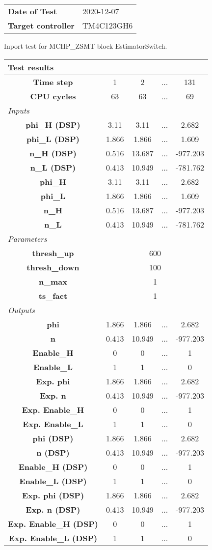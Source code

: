 \begin{tabular}{l l}
\textbf{Date of Test} & 2020-12-07 \tabularnewline
\textbf{Target controller} & TM4C123GH6 \tabularnewline
\end{tabular}
\vspace{1ex}
Inport test for MCHP_ZSMT block EstimatorSwitch.

\vspace{1em}
\begin{tabularx}{\textwidth}{|c|c|c|>{\centering\arraybackslash}X|c|}
\hline
\multicolumn{5}{|l|}{\cellcolor[gray]{0.8}\textbf{Test results}} \tabularnewline \hline
\textbf{Time step} & 1 & 2 & ... & 131 \tabularnewline \hline
\textbf{CPU cycles} & 63 & 63 & ... & 69 \tabularnewline \hline
\multicolumn{5}{|l|}{\cellcolor[gray]{0.9}\textit{Inputs}} \tabularnewline \hline
\textbf{phi\_H (DSP)} & 3.11 & 3.11 & ... & 2.682 \tabularnewline \hline
\textbf{phi\_L (DSP)} & 1.866 & 1.866 & ... & 1.609 \tabularnewline \hline
\textbf{n\_H (DSP)} & 0.516 & 13.687 & ... & -977.203 \tabularnewline \hline
\textbf{n\_L (DSP)} & 0.413 & 10.949 & ... & -781.762 \tabularnewline \hline
\textbf{phi\_H} & 3.11 & 3.11 & ... & 2.682 \tabularnewline \hline
\textbf{phi\_L} & 1.866 & 1.866 & ... & 1.609 \tabularnewline \hline
\textbf{n\_H} & 0.516 & 13.687 & ... & -977.203 \tabularnewline \hline
\textbf{n\_L} & 0.413 & 10.949 & ... & -781.762 \tabularnewline \hline
\multicolumn{5}{|l|}{\cellcolor[gray]{0.9}\textit{Parameters}} \tabularnewline \hline
\textbf{thresh\_up} & \multicolumn{4}{c|}{600} \tabularnewline \hline
\textbf{thresh\_down} & \multicolumn{4}{c|}{100} \tabularnewline \hline
\textbf{n\_max} & \multicolumn{4}{c|}{1} \tabularnewline \hline
\textbf{ts\_fact} & \multicolumn{4}{c|}{1} \tabularnewline \hline
\multicolumn{5}{|l|}{\cellcolor[gray]{0.9}\textit{Outputs}} \tabularnewline \hline
\textbf{phi} & 1.866 & 1.866 & ... & 2.682 \tabularnewline \hline
\textbf{n} & 0.413 & 10.949 & ... & -977.203 \tabularnewline \hline
\textbf{Enable\_H} & 0 & 0 & ... & 1 \tabularnewline \hline
\textbf{Enable\_L} & 1 & 1 & ... & 0 \tabularnewline \hline
\textbf{Exp. phi} & 1.866 & 1.866 & ... & 2.682 \tabularnewline \hline
\textbf{Exp. n} & 0.413 & 10.949 & ... & -977.203 \tabularnewline \hline
\textbf{Exp. Enable\_H} & 0 & 0 & ... & 1 \tabularnewline \hline
\textbf{Exp. Enable\_L} & 1 & 1 & ... & 0 \tabularnewline \hline
\textbf{phi (DSP)} & 1.866 & 1.866 & ... & 2.682 \tabularnewline \hline
\textbf{n (DSP)} & 0.413 & 10.949 & ... & -977.203 \tabularnewline \hline
\textbf{Enable\_H (DSP)} & 0 & 0 & ... & 1 \tabularnewline \hline
\textbf{Enable\_L (DSP)} & 1 & 1 & ... & 0 \tabularnewline \hline
\textbf{Exp. phi (DSP)} & 1.866 & 1.866 & ... & 2.682 \tabularnewline \hline
\textbf{Exp. n (DSP)} & 0.413 & 10.949 & ... & -977.203 \tabularnewline \hline
\textbf{Exp. Enable\_H (DSP)} & 0 & 0 & ... & 1 \tabularnewline \hline
\textbf{Exp. Enable\_L (DSP)} & 1 & 1 & ... & 0 \tabularnewline \hline
\end{tabularx}
\vspace{1ex}

